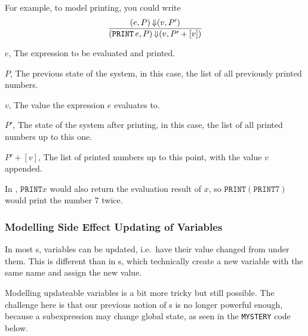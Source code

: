 For example, to model printing, you could write
\begin{equation}\label{eq:Semantic_Side_Effect_Printing}
  \frac{(e, P) \operatorname{\Downarrow} (v, P')}{(\mathtt{PRINT\,} e, P) \operatorname{\Downarrow} (v, P'+[v])}
\end{equation}
\begin{description}[noitemsep]
\item $e$, The expression to be evaluated and printed.
\item $P$, The previous state of the system, in this case, the list of all previously printed numbers.
\item $v$, The value the expression $e$ evaluates to.
\item $P'$, The state of the system after printing, in this case, the list of all printed numbers up to this one.
\item $P'+[v]$, The list of printed numbers up to this point, with the value $v$ appended.
\end{description}

\begin{remark*}
  In , $\mathtt{PRINT} x$ would also return the evaluation result of $x$, so $\mathtt{PRINT} (\mathtt{PRINT} 7)$ would print the number 7 twice.
\end{remark*}

\subsubsection{Modelling Side Effect Updating of Variables}\label{subsubsec:Model_Side_Effect_Variable_Update}
In most s, variables can be updated, i.e.\ have their value changed from under them.
This is different than in s, which technically create a new variable with the same name and assign the new value.

Modelling updateable variables is a bit more tricky but still possible.
The challenge here is that our previous notion of s is no longer powerful enough, because a subexpression may change global state, as seen in the \texttt{MYSTERY} code below.

\inputminted[frame=lines,linenos]{pascal}{./EDAP05-Concepts_Programming_Languages-Sections/Functional_Programming/Code/Global_State_Change.pas}

